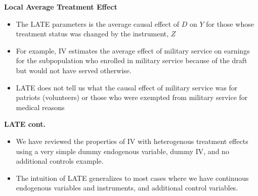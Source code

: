 \documentclass[notes=show]{beamer}
\begin{document}
\begin{frame}[plain]

	\begin{center}
	\textbf{Local Average Treatment Effect}
	\end{center}
	
	\begin{itemize}
	\item The LATE parameters is the average causal effect of $D$ on $Y$ for those whose treatment status was changed by the instrument, $Z$
	\item For example, IV estimates the average effect of military service on earnings for the subpopulation who enrolled in military service because of the draft but would not have served otherwise. 
	\item LATE does not tell us what the causal effect of military service was for patriots (volunteers) or those who were exempted from military service for medical reasons 
	\end{itemize}
	
\end{frame}

\begin{frame}[plain]
\begin{center}
\textbf{LATE cont.}
\end{center}

\begin{itemize}

	\item We have reviewed the properties of IV with heterogenous treatment effects using a very simple dummy endogenous variable, dummy IV, and no additional controls example.  
	\item The intuition of LATE generalizes to most cases where we have continuous endogenous variables and instruments, and additional control variables.

\end{itemize}

\end{frame}
\end{document}
